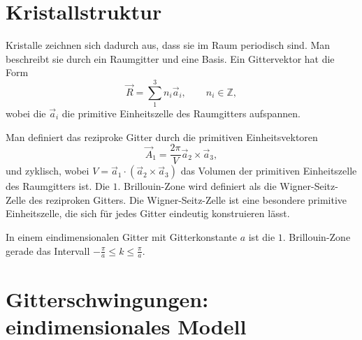 \section{Kristallstruktur}

Kristalle zeichnen sich dadurch aus, dass sie im Raum periodisch sind. Man beschreibt sie durch ein Raumgitter und eine Basis. Ein Gittervektor hat die Form
\begin{equation}
 \vec{R} = \sum_{1}^{3} n_{i}\vec{a}_{i}, \qquad n_{i}\in \mathbb{Z},
\end{equation}
wobei die $\vec{a}_{i}$ die primitive Einheitszelle des Raumgitters aufspannen.

Man definiert das reziproke Gitter durch die primitiven Einheitsvektoren
\begin{equation}
 \vec{A}_{1} = \frac{2\pi}{V} \vec{a}_{2}\times\vec{a}_{3},
\end{equation}
und zyklisch, wobei $V=\vec{a}_{1}\cdot\left(\vec{a}_{2}\times\vec{a}_{3}\right)$ das Volumen der primitiven Einheitszelle des Raumgitters ist. Die $1.$ Brillouin-Zone wird definiert als die Wigner-Seitz-Zelle des reziproken Gitters. Die Wigner-Seitz-Zelle ist eine besondere primitive Einheitszelle, die sich für jedes Gitter eindeutig konstruieren lässt.

In einem eindimensionalen Gitter mit Gitterkonstante $a$ ist die $1.$ Brillouin-Zone gerade das Intervall $-\frac{\pi}{a}\leq k \leq \frac{\pi}{a}$.

\section{Gitterschwingungen: eindimensionales Modell}

